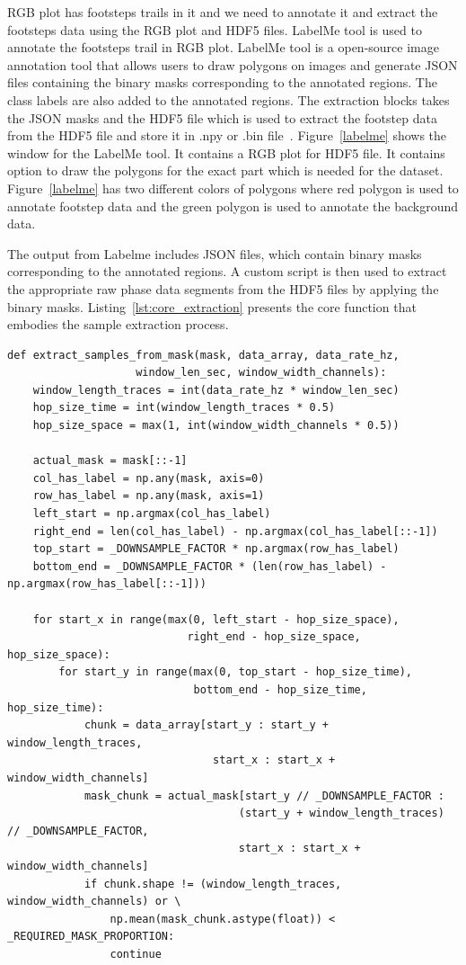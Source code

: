 RGB plot has footsteps trails in it and we need to annotate it and extract the footsteps data using the RGB plot and HDF5 files. LabelMe tool is used to annotate the footsteps trail in RGB plot. LabelMe tool is a open-source image annotation tool that allows users to draw polygons on images and generate JSON files containing the binary masks corresponding to the annotated regions. The class labels are also added to the annotated regions. The extraction blocks takes the JSON masks and the HDF5 file which is used to extract the footstep data from the HDF5 file and store it in .npy or .bin file~\cite{Labelme}. Figure~\ref{labelme} shows the window for the LabelMe tool. It contains a RGB plot for HDF5 file. It contains option to draw the polygons for the exact part which is needed for the dataset. Figure~\ref{labelme} has two different colors of polygons where red polygon is used to annotate footstep data and the green polygon is used to annotate the background data.

The output from Labelme includes JSON files, which contain binary masks corresponding to the annotated regions. A custom script is then used to extract the appropriate raw phase data segments from the HDF5 files by applying the binary masks. Listing~\ref{lst:core_extraction} presents the core function that embodies the sample extraction process.

\begin{lstlisting}[style=pythonstyle, caption={Core logic for extracting samples from a mask}, label=lst:core_extraction]
def extract_samples_from_mask(mask, data_array, data_rate_hz, 
                    window_len_sec, window_width_channels):
    window_length_traces = int(data_rate_hz * window_len_sec)
    hop_size_time = int(window_length_traces * 0.5)
    hop_size_space = max(1, int(window_width_channels * 0.5))
    
    actual_mask = mask[::-1]
    col_has_label = np.any(mask, axis=0)
    row_has_label = np.any(mask, axis=1)
    left_start = np.argmax(col_has_label)
    right_end = len(col_has_label) - np.argmax(col_has_label[::-1])
    top_start = _DOWNSAMPLE_FACTOR * np.argmax(row_has_label)
    bottom_end = _DOWNSAMPLE_FACTOR * (len(row_has_label) - np.argmax(row_has_label[::-1]))
    
    for start_x in range(max(0, left_start - hop_size_space), 
                            right_end - hop_size_space, hop_size_space):
        for start_y in range(max(0, top_start - hop_size_time), 
                             bottom_end - hop_size_time, hop_size_time):
            chunk = data_array[start_y : start_y + window_length_traces, 
                                start_x : start_x + window_width_channels]
            mask_chunk = actual_mask[start_y // _DOWNSAMPLE_FACTOR : 
                                    (start_y + window_length_traces) // _DOWNSAMPLE_FACTOR,
                                    start_x : start_x + window_width_channels]
            if chunk.shape != (window_length_traces, window_width_channels) or \
                np.mean(mask_chunk.astype(float)) < _REQUIRED_MASK_PROPORTION:
                continue
    \end{lstlisting}

